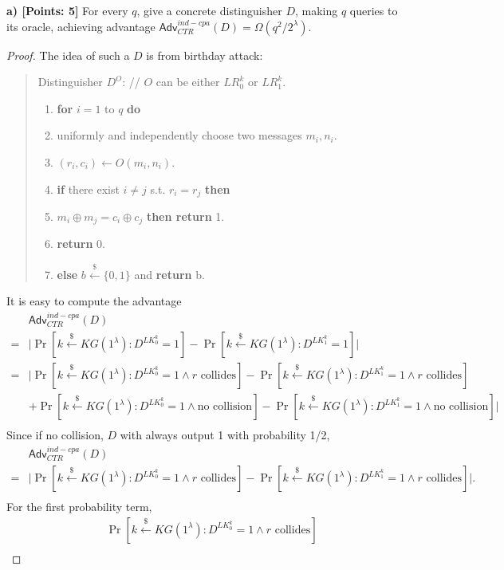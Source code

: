 \documentclass[12pt]{article}
\newcommand{\bits}{\{0,1\}}
\newcommand{\getsr}{\stackrel{\$}{\gets}}
\newcommand{\Adv}{\textsf{Adv}}
\newcommand{\tab}{\hspace{0.3in}}
\theoremstyle{definition}
\begin{document}
{\bf a) [Points: 5]} For every $q$, give a concrete distinguisher $D$, making $q$ queries to its oracle, achieving advantage
$\Adv_{CTR}^{ind-cpa}(D) = \Omega(q^2/2^\lambda)$.
\begin{proof}
The idea of such a $D$ is from birthday attack:
\begin{quote}
Distinguisher $D^O$: // $O$ can be either $LR_0^k$ or $LR_1^k$.
\begin{enumerate}
\item {\bf for} $i=1$ to $q$ {\bf do}
\item \tab uniformly and independently choose two messages $m_i, n_i$.%
\item \tab $(r_i, c_i) \gets O(m_i, n_i)$.
\item {\bf if} there exist $i\not= j$ s.t. $r_i = r_j$ {\bf then}
\item \tab {\bf if} $m_i \oplus m_j = c_i \oplus c_j$ {\bf then return} 1.
\item \tab {\bf else} {\bf return} 0.
\item {\bf else} $b\getsr\bits$ and {\bf return} b.
\end{enumerate}
\end{quote}
It is easy to compute the advantage 
$$\begin{aligned}
& \Adv_{CTR}^{ind-cpa}(D) \\
=& \bigg| \Pr[k \getsr KG(1^\lambda) : D^{LK_0^k}=1] - \Pr[k \getsr KG(1^\lambda) : D^{LK_1^k}=1] \bigg| \\
=& \bigg| \Pr[k \getsr KG(1^\lambda) : D^{LK_0^k}=1 \wedge \textrm{$r$ collides}] - \Pr[k \getsr KG(1^\lambda) : D^{LK_1^k}=1 \wedge \textrm{$r$ collides}] \\
&+\Pr[k \getsr KG(1^\lambda) : D^{LK_0^k}=1 \wedge \textrm{no collision}] - \Pr[k \getsr KG(1^\lambda) : D^{LK_1^k}=1 \wedge \textrm{no collision}] \bigg| \\
\end{aligned}$$
Since if no collision, $D$ with always output 1 with probability 1/2,
$$\begin{aligned}
& \Adv_{CTR}^{ind-cpa}(D) \\
=& \bigg| \Pr[k \getsr KG(1^\lambda) : D^{LK_0^k}=1 \wedge \textrm{$r$ collides}] - \Pr[k \getsr KG(1^\lambda) : D^{LK_1^k}=1 \wedge \textrm{$r$ collides}] \bigg|. \\
\end{aligned}$$
For the first probability term,
$$\begin{aligned}
& \Pr[k \getsr KG(1^\lambda) : D^{LK_0^k}=1 \wedge \textrm{$r$ collides}] \\

\end{aligned}$$
\end{proof}
\end{document}
